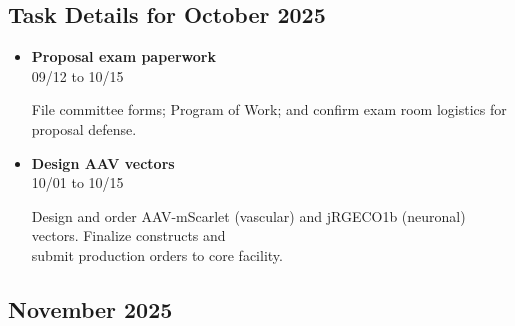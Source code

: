 \documentclass[landscape,a4paper]{article}
\begin{document}
\subsection{Task Details for October 2025}
\begin{itemize}[leftmargin=1cm, itemsep=0.8em]
    \item \textcolor{other}{\textbf{Proposal exam paperwork}}\\[0.2em]
          \textcolor{black!70}{\small 09/12 to 10/15}
\\[0.3em]
          \begin{minipage}[t]{0.85\textwidth}
          \textcolor{black!80}{File committee forms; Program of Work; and confirm exam room logistics for\\[0.1em]
          proposal defense.}
          \end{minipage}

    \item \textcolor{other}{\textbf{Design AAV vectors}}\\[0.2em]
          \textcolor{black!70}{\small 10/01 to 10/15}
\\[0.3em]
          \begin{minipage}[t]{0.85\textwidth}
          \textcolor{black!80}{Design and order AAV-mScarlet (vascular) and jRGECO1b (neuronal) vectors. Finalize constructs and\\[0.1em]
          submit production orders to core facility.}
          \end{minipage}

\end{itemize}

\subsection*{November 2025}
\vspace{0.5cm}
\end{document}
